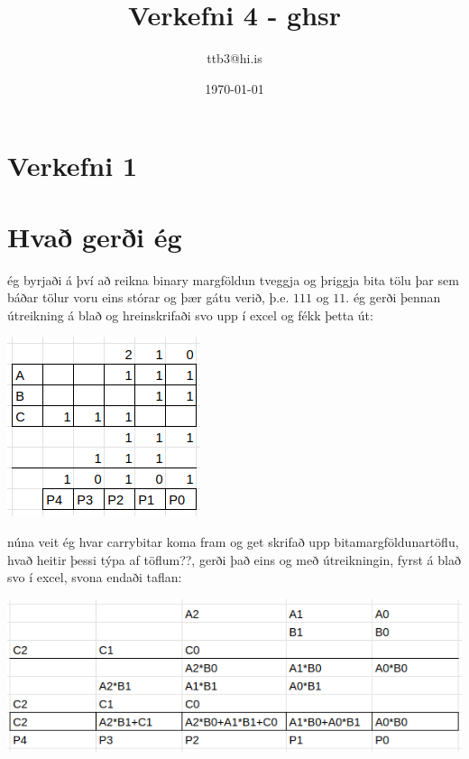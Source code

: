 \documentclass{article}
\title{Verkefni 4 - ghsr}
\author{ttb3@hi.is}
\date{\today}
\begin{document}
\maketitle


\section*{Verkefni 1}

\section*{Hvað gerði ég}
ég byrjaði á því að reikna binary margföldun tveggja og þriggja bita tölu þar sem báðar tölur voru eins stórar og þær gátu verið, þ.e. $111$ og $11$.
ég gerði þennan útreikning á blað og hreinskrifaði svo upp í excel og fékk þetta út:
\begin{center}
    \includegraphics{imgs/Screenshot from 2022-03-11 10-17-35.png}
\end{center}

núna veit ég hvar carrybitar koma fram og get skrifað upp bitamargföldunartöflu, hvað heitir þessi týpa af töflum??, 
gerði það eins og með útreikningin, fyrst á blað svo í excel, svona endaði taflan:
\begin{center}
    \includegraphics[scale=0.55]{imgs/Screenshot from 2022-03-11 10-23-10.png}
\end{center}
\end{document}
